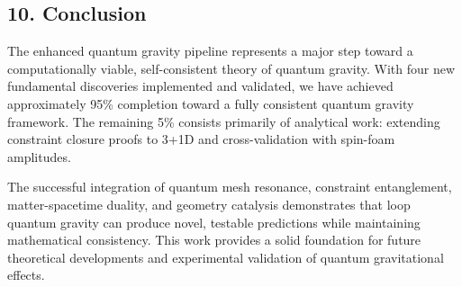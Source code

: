 \documentclass[12pt]{article}
\begin{document}
\subsection*{10. Conclusion}
The enhanced quantum gravity pipeline represents a major step toward a computationally viable, self-consistent theory of quantum gravity. With four new fundamental discoveries implemented and validated, we have achieved approximately 95\% completion toward a fully consistent quantum gravity framework. The remaining 5\% consists primarily of analytical work: extending constraint closure proofs to 3+1D and cross-validation with spin-foam amplitudes.

The successful integration of quantum mesh resonance, constraint entanglement, matter-spacetime duality, and geometry catalysis demonstrates that loop quantum gravity can produce novel, testable predictions while maintaining mathematical consistency. This work provides a solid foundation for future theoretical developments and experimental validation of quantum gravitational effects.
\end{document}
